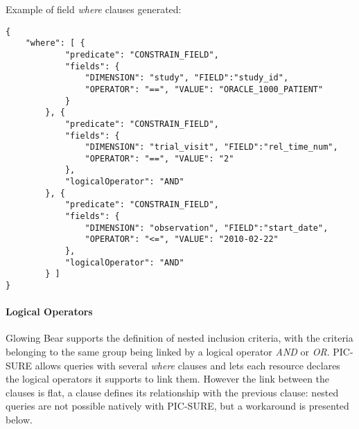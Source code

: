 Example of field \emph{where} clauses generated:
\begin{verbatim}
{
    "where": [ {
            "predicate": "CONSTRAIN_FIELD", 
            "fields": { 
                "DIMENSION": "study", "FIELD":"study_id", 
                "OPERATOR": "==", "VALUE": "ORACLE_1000_PATIENT" 
            } 
        }, {
            "predicate": "CONSTRAIN_FIELD", 
            "fields": { 
                "DIMENSION": "trial_visit", "FIELD":"rel_time_num", 
                "OPERATOR": "==", "VALUE": "2" 
            },
            "logicalOperator": "AND"
        }, {
            "predicate": "CONSTRAIN_FIELD", 
            "fields": { 
                "DIMENSION": "observation", "FIELD":"start_date", 
                "OPERATOR": "<=", "VALUE": "2010-02-22" 
            },
            "logicalOperator": "AND"
        } ]
}
\end{verbatim}



\paragraph{Logical Operators}
\label{sec:gb-logical-operators}

Glowing Bear supports the definition of nested inclusion criteria, with the criteria belonging to the same group being linked by a logical operator \emph{AND} or \emph{OR}.
PIC-SURE allows queries with several \emph{where} clauses and lets each resource declares the logical operators it supports to link them. 
However the link between the clauses is flat, a clause defines its relationship with the previous clause: nested queries are not possible natively with PIC-SURE, but a workaround is presented below.

